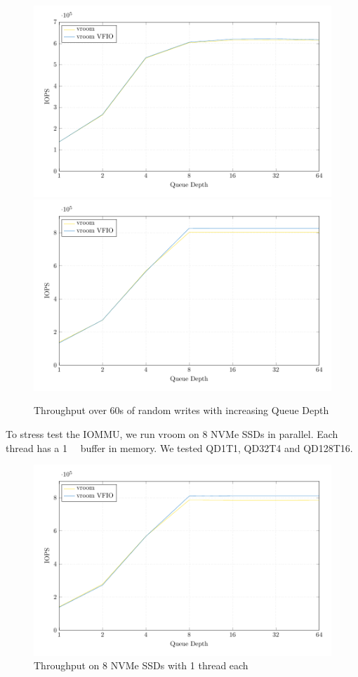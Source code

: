 \begin{figure}[H]
  \centering
   {\includegraphics[width=.8\textwidth]{figures/qdnt1_2MiB} \label{fig:qdnt1-2MiB-intel}}
   {\includegraphics[width=.8\textwidth]{figures/qdnt1_2MiB_epyc} \label{fig:qdnt1-2MiB-epyc}}
  \caption{Throughput over 60s of random writes with increasing Queue Depth}
  \label{fig:qdnt1-2MiB}
\end{figure}

To stress test the IOMMU, we run vroom on 8 NVMe SSDs in parallel. Each thread has a \qty{1}{\gibi\byte} buffer in memory. We tested QD1T1, QD32T4 and QD128T16.

\begin{figure}[H]
  \centering
  \includegraphics[width=\textwidth]{figures/qdnt1_2MiB_8nvmes}
  \caption{Throughput on 8 NVMe SSDs with 1 thread each}
  \label{fig:8nvmes}
\end{figure}

